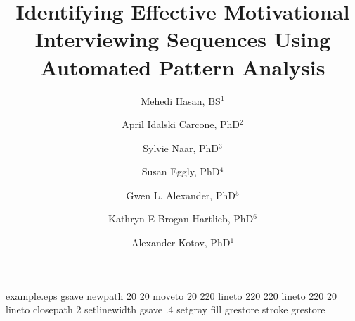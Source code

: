 %
%
%
%
%
\begin{filecontents*}{example.eps}
gsave
newpath
  20 20 moveto
  20 220 lineto
  220 220 lineto
  220 20 lineto
closepath
2 setlinewidth
gsave
  .4 setgray fill
grestore
stroke
grestore
\end{filecontents*}
%
\RequirePackage{fix-cm}
%
\documentclass[smallextended]{svjour3}       %
%
\smartqed  %
%
\usepackage{graphicx}
\usepackage[numbers]{natbib}
\usepackage{geometry}
\usepackage{pdflscape}
%
\usepackage{mathptmx}      %
%
%
%
\usepackage{rotating}
%


\title{Identifying Effective Motivational Interviewing Sequences Using Automated Pattern Analysis
}


\author{Mehedi Hasan, BS$^1$\and 
April Idalski Carcone, PhD$^2$\and 
Sylvie Naar, PhD$^3$\and 
Susan Eggly, PhD$^4$\and  
Gwen L. Alexander, PhD$^5$\and 
Kathryn E Brogan Hartlieb, PhD$^6$\and 
Alexander Kotov, PhD$^1$
}


